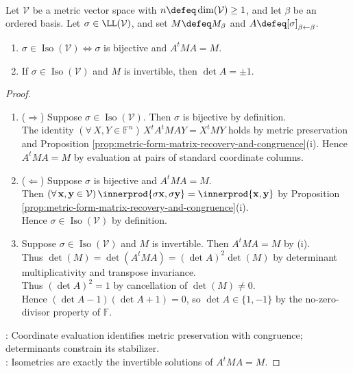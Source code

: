 \begin{proposition} \label{prop:matrix-criterion-for-metric-isometries} \\
Let $\mathcal{V}$ be a metric vector space with $n\defeq\dim(\mathcal{V})\geq1$, and let $\beta$ be an ordered basis. Let $\sigma\in\LL(\mathcal{V})$, and set $M\defeq M_{\beta}$ and $A\defeq[\sigma]_{\beta\leftarrow\beta}$.
\begin{enumerate}[label=(\roman*)]
\setlength{\itemsep}{0pt}
\item $\sigma\in\operatorname{Iso}(\mathcal{V})\Longleftrightarrow\sigma$ is bijective and $A^tMA=M$.
\item If $\sigma\in\operatorname{Iso}(\mathcal{V})$ and $M$ is invertible, then $\det A=\pm1$.
\end{enumerate}
\begin{proof}
\begin{enumerate}[label=(\roman*)]
\setlength{\itemsep}{0pt}
\item[$(i)$] ($\Rightarrow$) Suppose $\sigma\in\operatorname{Iso}(\mathcal{V})$. Then $\sigma$ is bijective by definition.\\
The identity $(\forall\,X,Y\in\mathbb{F}^n)\,X^tA^tMAY=X^tMY$ holds by metric preservation and Proposition \ref{prop:metric-form-matrix-recovery-and-congruence}(i). Hence $A^tMA=M$ by evaluation at pairs of standard coordinate columns.
\item[$(i)$] ($\Leftarrow$) Suppose $\sigma$ is bijective and $A^tMA=M$.\\
Then $(\forall\,\mathbf{x},\mathbf{y}\in\mathcal{V})\,\innerprod{\sigma\mathbf{x},\sigma\mathbf{y}}=\innerprod{\mathbf{x},\mathbf{y}}$ by Proposition \ref{prop:metric-form-matrix-recovery-and-congruence}(i).\\
Hence $\sigma\in\operatorname{Iso}(\mathcal{V})$ by definition.
\item[$(ii)$] Suppose $\sigma\in\operatorname{Iso}(\mathcal{V})$ and $M$ is invertible. Then $A^tMA=M$ by (i).\\
Thus $\det(M)=\det(A^tMA)=(\det A)^2\det(M)$ by determinant multiplicativity and transpose invariance.\\
Thus $(\det A)^2=1$ by cancellation of $\det(M)\neq0$.\\
Hence $(\det A-1)(\det A+1)=0$, so $\det A\in\{1,-1\}$ by the no-zero-divisor property of $\mathbb{F}$.
\end{enumerate}
: Coordinate evaluation identifies metric preservation with congruence; determinants constrain its stabilizer.\\
: Isometries are exactly the invertible solutions of $A^tMA=M$.
\end{proof}
\end{proposition}

